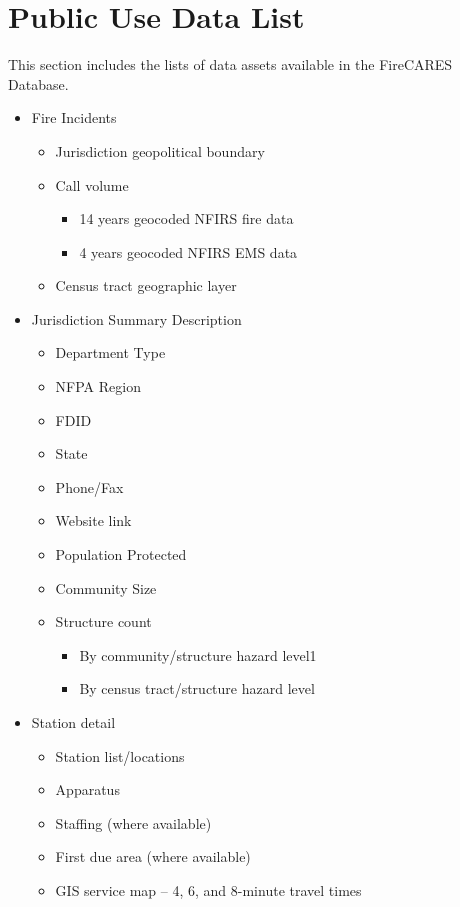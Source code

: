 \documentclass[12pt,oneside]{book}
\begin{document}
\chapter{Public Use Data List}
This section includes the lists of data assets available in the FireCARES Database.
\begin{itemize}[noitemsep]
\item Fire Incidents
  \begin{itemize}[noitemsep]
  \item Jurisdiction geopolitical boundary
  \item Call volume
    \begin{itemize}[noitemsep]
    \item 14 years geocoded NFIRS fire data
    \item 4 years geocoded NFIRS EMS data
    \end{itemize}
  \item Census tract geographic layer
  \end{itemize}
\item Jurisdiction Summary Description
  \begin{itemize}[noitemsep]
  \item Department Type
  \item NFPA Region
  \item FDID
  \item State
  \item Phone/Fax
  \item Website link
  \item Population Protected
  \item Community Size
  \item Structure count
    \begin{itemize}[noitemsep]
    \item By community/structure hazard level1
    \item By census tract/structure hazard level
    \end{itemize}
  \end{itemize}
\item Station detail
  \begin{itemize}[noitemsep]
  \item Station list/locations
  \item Apparatus
  \item Staffing (where available)
  \item First due area (where available)
  \item GIS service map – 4, 6, and 8-minute travel times

\end{itemize}
\end{itemize}
\end{document}
